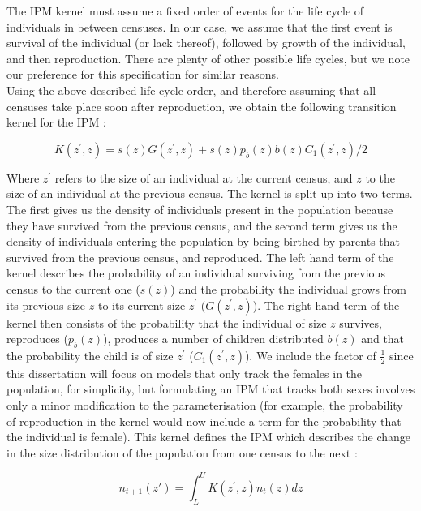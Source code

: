 \documentclass[a4paper,12pt]{article}
\begin{document}
The IPM kernel must assume a fixed order of events for the life cycle of individuals in between censuses. In our case, we assume that the first event is survival of the individual (or lack thereof), followed by growth of the individual, and then reproduction. There are plenty of other possible life cycles, but we note our preference for this specification for similar reasons. \\

Using the above described life cycle order, and therefore assuming that all censuses take place soon after reproduction, we obtain the following transition kernel for the IPM \citep{Ellner}:

\begin{equation}
    K(z^{'}, z) = s(z)G(z^{'}, z) + s(z)p_b(z)b(z)C_1(z^{'},z)/2
\end{equation}

Where $z^{'}$ refers to the size of an individual at the current census, and $z$ to the size of an individual at the previous census. The kernel is split up into two terms. The first gives us the density of individuals present in the population because they have survived from the previous census, and the second term gives us the density of individuals entering the population by being birthed by parents that survived from the previous census, and reproduced. The left hand term of the kernel describes the probability of an individual surviving from the previous census to the current one ($s(z)$) and the probability the individual grows from its previous size $z$ to its current size $z^{'}$ ($G(z^{'}, z)$). The right hand term of the kernel then consists of the probability that the individual of size $z$ survives, reproduces ($p_b(z)$), produces a number of children distributed $b(z)$ and that the probability the child is of size $z^{'}$ ($C_1(z^{'},z)$). We include the factor of $\frac{1}{2}$ since this dissertation will focus on models that only track the females in the population, for simplicity, but formulating an IPM that tracks both sexes involves only a minor modification to the parameterisation (for example, the probability of reproduction in the kernel would now include a term for the probability that the individual is female). This kernel defines the IPM which describes the change in the size distribution of the population from one census to the next \citep{Ellner}:

\begin{equation}
    n_{t+1}(z') = \int_L^U K(z^{'}, z)n_t(z)dz
\end{equation}
\end{document}
